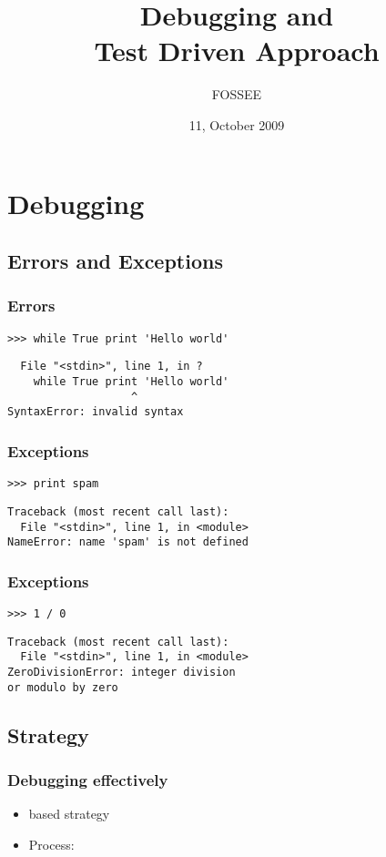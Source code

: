 \documentclass[compress,14pt]{beamer}
\title[]{Debugging and \\Test Driven Approach}
\author[FOSSEE] {FOSSEE}
\institute[IIT Bombay] {Department of Aerospace Engineering\\IIT Bombay}
\date[] {11, October 2009}
\date[] %
\begin{document}
\begin{frame}
  \maketitle
\end{frame}


\section{Debugging}
\subsection{Errors and Exceptions}
\begin{frame}[fragile]
 \frametitle{Errors}
 \begin{lstlisting}
>>> while True print 'Hello world'
 \end{lstlisting}
\pause
  \begin{lstlisting}
  File "<stdin>", line 1, in ?
    while True print 'Hello world'
                   ^
SyntaxError: invalid syntax
\end{lstlisting}
\end{frame}

\begin{frame}[fragile]
 \frametitle{Exceptions}
 \begin{lstlisting}
>>> print spam
\end{lstlisting}
\pause
\begin{lstlisting}
Traceback (most recent call last):
  File "<stdin>", line 1, in <module>
NameError: name 'spam' is not defined
\end{lstlisting}
\end{frame}

\begin{frame}[fragile]
 \frametitle{Exceptions}
 \begin{lstlisting}
>>> 1 / 0
\end{lstlisting}
\pause
\begin{lstlisting}
Traceback (most recent call last):
  File "<stdin>", line 1, in <module>
ZeroDivisionError: integer division 
or modulo by zero
\end{lstlisting}
\end{frame}

\subsection{Strategy}
\begin{frame}[fragile]
    \frametitle{Debugging effectively}
    \begin{itemize}
        \item {} based strategy
        \item Process:
    \end{itemize}
\begin{center}
\end{center}
\end{frame}
\end{document}
